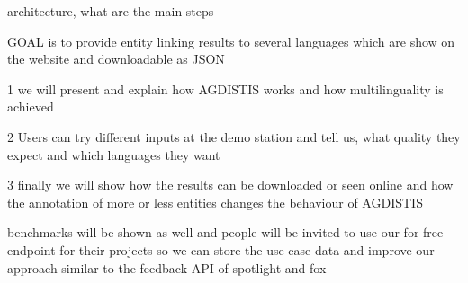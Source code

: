architecture, what are the main steps

GOAL is to provide entity linking results to several languages which are show on the website and downloadable as JSON

1 we will present and explain how AGDISTIS works and how multilinguality is achieved

2 Users can try different inputs at the demo station and tell us, what quality they expect and which languages they want

3 finally we will show how the results can be downloaded or seen online and how the annotation of more or less entities changes the behaviour of AGDISTIS

benchmarks will be shown as well and people will be invited to use our for free endpoint for their projects so we can store the use case data and improve our approach similar to the feedback API of spotlight and fox

